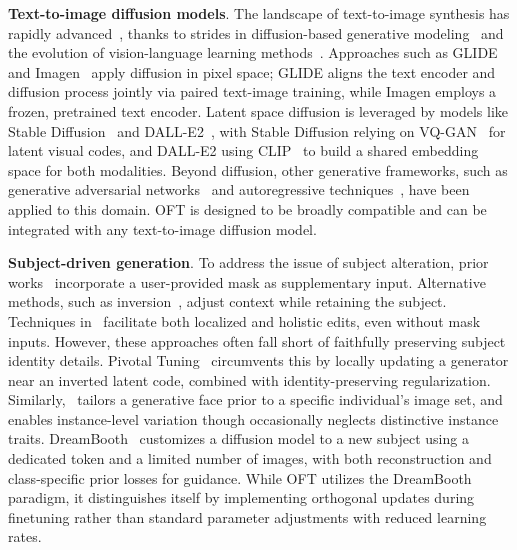 \textbf{Text-to-image diffusion models}. The landscape of text-to-image synthesis has rapidly advanced~\cite{saharia2022photorealistic,ramesh2022hierarchical,rombach2022high,gu2022vector,nichol2022glide}, thanks to strides in diffusion-based generative modeling~\cite{ho2020denoising,song2021score,song2021denoising,dhariwal2021diffusion} and the evolution of vision-language learning methods~\cite{su2020vlbert,lu2019vilbert,radford2021learning,wang2021simvlm,li2022blip,li2023blip,alayrac2022flamingo,schuhmann2022laion}. Approaches such as GLIDE~\cite{nichol2022glide} and Imagen~\cite{saharia2022photorealistic} apply diffusion in pixel space; GLIDE aligns the text encoder and diffusion process jointly via paired text-image training, while Imagen employs a frozen, pretrained text encoder. Latent space diffusion is leveraged by models like Stable Diffusion~\cite{rombach2022high} and DALL-E2~\cite{ramesh2022hierarchical}, with Stable Diffusion relying on VQ-GAN~\cite{esser2021taming} for latent visual codes, and DALL-E2 using CLIP~\cite{radford2021learning} to build a shared embedding space for both modalities. Beyond diffusion, other generative frameworks, such as generative adversarial networks~\cite{reed2016generative,zhang2017stackgan,xu2018attngan,li2019controllable} and autoregressive techniques~\cite{ramesh2021zero,ding2021cogview,wu2022nuwa,yuscaling}, have been applied to this domain. OFT is designed to be broadly compatible and can be integrated with any text-to-image diffusion model.

\textbf{Subject-driven generation}. To address the issue of subject alteration, prior works~\cite{avrahami2022blended,nichol2022glide} incorporate a user-provided mask as supplementary input. Alternative methods, such as inversion~\cite{choi2021ilvr,dhariwal2021diffusion,ramesh2022hierarchical,gal2022image}, adjust context while retaining the subject. Techniques in~\cite{hertz2022prompt} facilitate both localized and holistic edits, even without mask inputs. However, these approaches often fall short of faithfully preserving subject identity details. Pivotal Tuning~\cite{roich2022pivotal} circumvents this by locally updating a generator near an inverted latent code, combined with identity-preserving regularization. Similarly,~\cite{nitzan2022mystyle} tailors a generative face prior to a specific individual's image set, and~\cite{casanova2021instance} enables instance-level variation though occasionally neglects distinctive instance traits. DreamBooth~\cite{ruiz2023dreambooth} customizes a diffusion model to a new subject using a dedicated token and a limited number of images, with both reconstruction and class-specific prior losses for guidance. While OFT utilizes the DreamBooth paradigm, it distinguishes itself by implementing orthogonal updates during finetuning rather than standard parameter adjustments with reduced learning rates.

